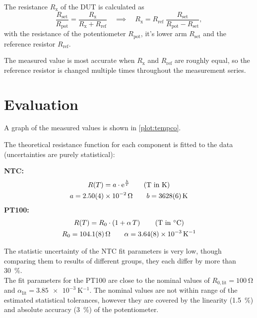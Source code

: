 The resistance $R_\text{x}$ of the DUT is calculated as
\begin{equation}
	\frac{R_\text{set}}{R_\text{pot}} = \frac{R_\text{x}}{R_\text{x} + R_\text{ref}}
	\quad \implies \quad R_\text{x} = R_\text{ref} \; \frac{R_\text{set}}{R_\text{pot} - R_\text{set}},
\end{equation}
with the resistance of the potentiometer $R_\text{pot}$, it's lower arm $R_\text{set}$ and the reference resistor $R_\text{ref}$.

The measured value is most accurate when $R_\text{x}$ and $R_\text{ref}$ are roughly equal, so the reference resistor is changed multiple times throughout the measurement series.

\section{Evaluation}

A graph of the measured values is shown in \autoref{plot:tempco}.

The theoretical resistance function for each component is fitted to the data (uncertainties are purely statistical):

\textbf{NTC:}
\begin{gather*}
	R(T) = a \cdot \mathrm{e}^{\frac{b}{T}} \tag*{(T in \si{\kelvin})}\\
	a = \SI{2.50(4)e-2}{\ohm}	\qquad	b = \SI{3628(6)}{\kelvin}
\end{gather*}
\textbf{PT100:}
\begin{gather*}
	R(T) = R_0 \cdot \left(1 + \alpha \, T \right) \tag*{(T in \si{\celsius})}\\
	R_0 = \SI{104.1(8)}{\ohm}	\qquad	\alpha = \SI{3.64(8)e-3}{\kelvin^{-1}}
\end{gather*}

The statistic uncertainty of the NTC fit parameters is very low, though comparing them to results of different groups, they each differ by more than \SI{30}{\percent}.\\
The fit parameters for the PT100 are close to the nominal values of $R_{0,\text{lit}} = \SI{100}{\ohm}$ and $\alpha_\text{lit} = \SI{3.85e-3}{\kelvin^{-1}}$.
The nominal values are not within range of the estimated statistical tolerances, however they are covered by the linearity (\SI{1.5}{\percent}) and absolute accuracy (\SI{3}{\percent}) of the potentiometer.

